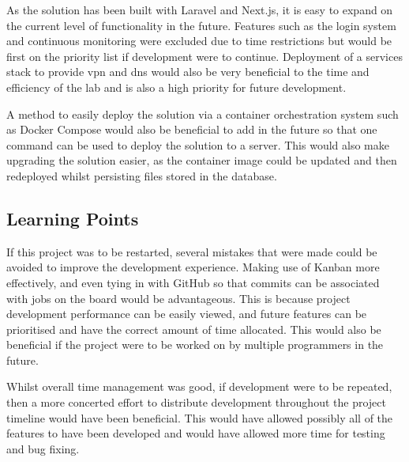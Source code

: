 As the solution has been built with Laravel and Next.js, it is easy to expand on the current level of functionality in the future. Features such as the login system and continuous monitoring were excluded due to time restrictions but would be first on the priority list if development were to continue. Deployment of a services stack to provide \gls{vpn} and \gls{dns} would also be very beneficial to the time and efficiency of the lab and is also a high priority for future development.

A method to easily deploy the solution via a container orchestration system such as Docker Compose would also be beneficial to add in the future so that one command can be used to deploy the solution to a server. This would also make upgrading the solution easier, as the container image could be updated and then redeployed whilst persisting files stored in the database.

\subsection{Learning Points}
\label{sec:learning-points}
If this project was to be restarted, several
mistakes that were made could be avoided to improve the development experience.
Making use of Kanban more effectively, and even tying in with GitHub so that
commits can be associated with jobs on the board would be advantageous. This is
because project development performance can be easily viewed, and future
features can be prioritised and have the correct amount of time allocated. This would also be beneficial if the project were to be worked on by multiple programmers in the future.

Whilst overall time management was good, if development were to be repeated, then a more concerted effort to distribute development throughout the project timeline would have been beneficial. This would have allowed possibly all of the features to have been developed and would have allowed more time for testing and bug fixing.